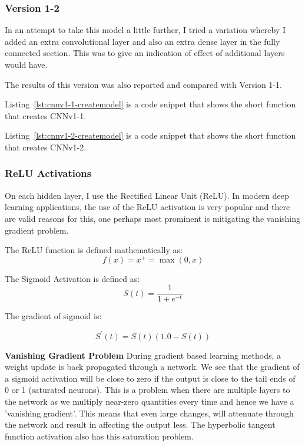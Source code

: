 \documentclass[12pt,a4paper,twoside]{report}
\begin{document}
\subsubsection{Version 1-2}
In an attempt to take this model a little further, I tried a variation whereby I added an extra convolutional layer and also an extra dense layer in the fully connected section. This was to give an indication of effect of additional layers would have.

The results of this version was also reported and compared with Version 1-1. 

Listing~\ref{lst:cnnv1-1-createmodel} is a code snippet that shows the short function that creates CNNv1-1. 



Listing~\ref{lst:cnnv1-2-createmodel} is a code snippet that shows the short function that creates CNNv1-2. 





\subsubsection{ReLU Activations}

On each hidden layer, I use the Rectified Linear Unit (ReLU). In modern deep learning applications, the use of the ReLU activation is very popular and there are valid reasons for this, one perhaps most prominent is mitigating the vanishing gradient problem. 

The ReLU function is defined mathematically as:
$$f ( x ) = x ^ { + } = \max ( 0,x )$$

The Sigmoid Activation is defined as:
$$S ( t ) = \frac { 1} { 1+ e ^ { - t } }$$

The gradient of sigmoid is:

$$S ^ { \prime } ( t ) = S ( t ) ( 1.0- S ( t ) )$$

\textbf{Vanishing Gradient Problem}
During gradient based learning methods, a weight update is back propagated through a network. We see that the gradient of a sigmoid activation will be close to zero if the output is close to the tail ends of 0 or 1 (saturated neurons). This is a problem when there are multiple layers to the network as we multiply near-zero quantities every time and hence we have a 'vanishing gradient'. This means that even large changes, will attenuate through the network and result in affecting the output less. The hyperbolic tangent function activation also has this saturation problem. 
\end{document}

